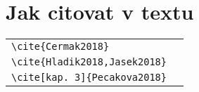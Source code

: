 \section{Jak citovat v textu}
\begin{center}
\begin{tabular}{l@{~~$\longrightarrow$~~}l}
\verb|\cite{Cermak2018}|&\cite{Cermak2018}\\
\verb|\cite{Hladik2018,Jasek2018}|&\cite{Hladik2018,Jasek2018}\\
\verb|\cite[kap. 3]{Pecakova2018}|&\cite[kap. 3]{Pecakova2018}\\
\end{tabular}
\end{center}
